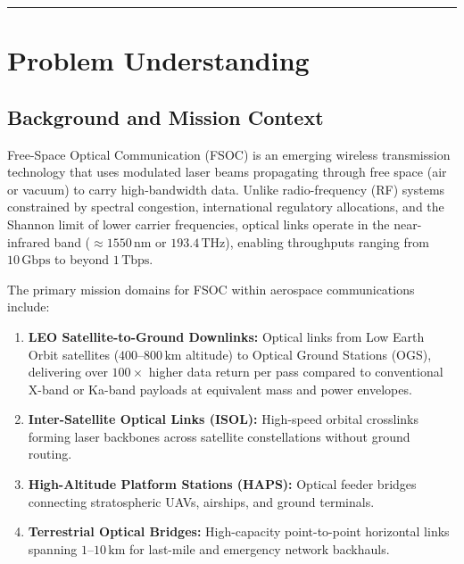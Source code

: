 \documentclass[11pt,a4paper]{article}
\begin{document}
\newpage
{}
\setcounter{page}{2}

{\small \tableofcontents}
\vspace{0.6cm}
\hrule
\vspace{0.6cm}

\section{Problem Understanding}

\subsection{Background and Mission Context}
Free-Space Optical Communication (FSOC) is an emerging wireless transmission technology that uses modulated laser beams propagating through free space (air or vacuum) to carry high-bandwidth data. Unlike radio-frequency (RF) systems constrained by spectral congestion, international regulatory allocations, and the Shannon limit of lower carrier frequencies, optical links operate in the near-infrared band ($\approx 1550\,\text{nm}$ or $193.4\,\text{THz}$), enabling throughputs ranging from $10\,\text{Gbps}$ to beyond $1\,\text{Tbps}$.

The primary mission domains for FSOC within aerospace communications include:
\begin{enumerate}[label=(\alph*),noitemsep,topsep=2pt]
    \item \textbf{LEO Satellite-to-Ground Downlinks:} Optical links from Low Earth Orbit satellites ($400$--$800\,\text{km}$ altitude) to Optical Ground Stations (OGS), delivering over $100\times$ higher data return per pass compared to conventional X-band or Ka-band payloads at equivalent mass and power envelopes.
    \item \textbf{Inter-Satellite Optical Links (ISOL):} High-speed orbital crosslinks forming laser backbones across satellite constellations without ground routing.
    \item \textbf{High-Altitude Platform Stations (HAPS):} Optical feeder bridges connecting stratospheric UAVs, airships, and ground terminals.
    \item \textbf{Terrestrial Optical Bridges:} High-capacity point-to-point horizontal links spanning $1$--$10\,\text{km}$ for last-mile and emergency network backhauls.
\end{enumerate}
\end{document}
